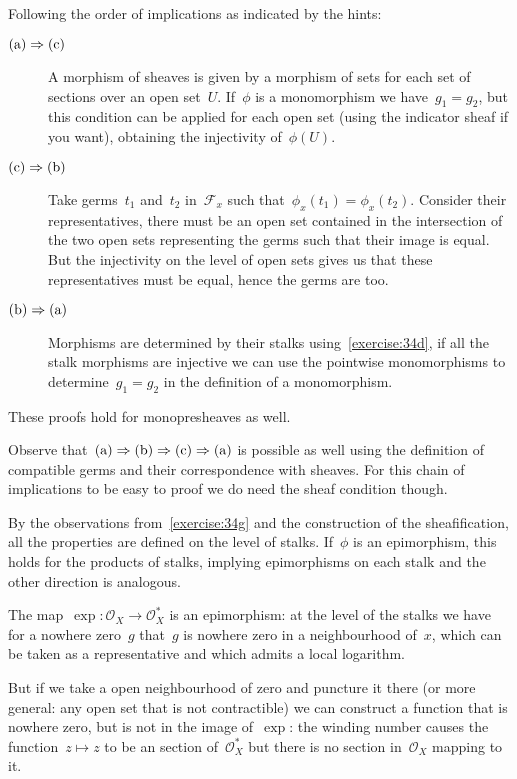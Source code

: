 \begin{exercise}
  \label{exercise:34n}
  Following the order of implications as indicated by the hints:
  \begin{description}
    \item[$\textnormal{(a)}\Rightarrow\textnormal{(c)}$] A morphism of sheaves is given by a morphism of sets for each set of sections over an open set~$U$. If~$\phi$ is a monomorphism we have~$g_1=g_2$, but this condition can be applied for each open set (using the indicator sheaf if you want), obtaining the injectivity of~$\phi(U)$.

    \item[$\textnormal{(c)}\Rightarrow\textnormal{(b)}$] Take germs~$t_1$ and~$t_2$ in~$\mathcal{F}_x$ such that~$\phi_x(t_1)=\phi_x(t_2)$. Consider their representatives, there must be an open set contained in the intersection of the two open sets representing the germs such that their image is equal. But the injectivity on the level of open sets gives us that these representatives must be equal, hence the germs are too.

    \item[$\textnormal{(b)}\Rightarrow\textnormal{(a)}$] Morphisms are determined by their stalks using~\autoref{exercise:34d}, if all the stalk morphisms are injective we can use the pointwise monomorphisms to determine~$g_1=g_2$ in the definition of a monomorphism.
  \end{description}

  These proofs hold for monopresheaves as well.

  Observe that~$\textnormal{(a)}\Rightarrow\textnormal{(b)}\Rightarrow\textnormal{(c)}\Rightarrow\textnormal{(a)}$ is possible as well using the definition of compatible germs and their correspondence with sheaves. For this chain of implications to be easy to proof we do need the sheaf condition though.
\end{exercise}

\begin{exercise}
  By the observations from~\autoref{exercise:34g} and the construction of the sheafification, all the properties are defined on the level of stalks. If~$\phi$ is an epimorphism, this holds for the products of stalks, implying epimorphisms on each stalk and the other direction is analogous.
\end{exercise}

\begin{exercise}
  \label{exercise:34p}
  The map~$\exp\colon\mathcal{O}_X\to\mathcal{O}_X^*$ is an epimorphism: at the level of the stalks we have for a nowhere zero~$g$ that~$g$ is nowhere zero in a neighbourhood of~$x$, which can be taken as a representative and which admits a local logarithm.

  But if we take a open neighbourhood of zero and puncture it there (or more general: any open set that is not contractible) we can construct a function that is nowhere zero, but is not in the image of~$\exp$: the winding number causes the function~$z\mapsto z$ to be an section of~$\mathcal{O}_X^*$ but there is no section in~$\mathcal{O}_X$ mapping to it.
\end{exercise}


